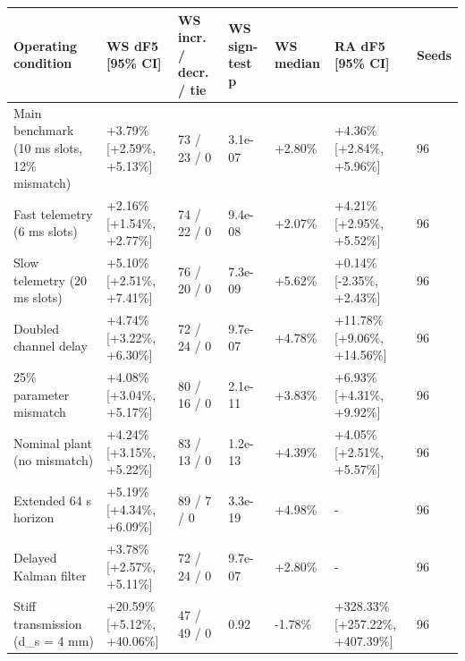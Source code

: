 \begin{tabular}{@{}lllllll@{}}
\toprule
Operating condition & WS dF5 [95\% CI] & WS incr. / decr. / tie & WS sign-test p & WS median & RA dF5 [95\% CI] & Seeds \\
\midrule
Main benchmark (10 ms slots, 12\% mismatch) & +3.79\% [+2.59\%, +5.13\%] & 73 / 23 / 0 & 3.1e-07 & +2.80\% & +4.36\% [+2.84\%, +5.96\%] & 96 \\
Fast telemetry (6 ms slots) & +2.16\% [+1.54\%, +2.77\%] & 74 / 22 / 0 & 9.4e-08 & +2.07\% & +4.21\% [+2.95\%, +5.52\%] & 96 \\
Slow telemetry (20 ms slots) & +5.10\% [+2.51\%, +7.41\%] & 76 / 20 / 0 & 7.3e-09 & +5.62\% & +0.14\% [-2.35\%, +2.43\%] & 96 \\
Doubled channel delay & +4.74\% [+3.22\%, +6.30\%] & 72 / 24 / 0 & 9.7e-07 & +4.78\% & +11.78\% [+9.06\%, +14.56\%] & 96 \\
25\% parameter mismatch & +4.08\% [+3.04\%, +5.17\%] & 80 / 16 / 0 & 2.1e-11 & +3.83\% & +6.93\% [+4.31\%, +9.92\%] & 96 \\
Nominal plant (no mismatch) & +4.24\% [+3.15\%, +5.22\%] & 83 / 13 / 0 & 1.2e-13 & +4.39\% & +4.05\% [+2.51\%, +5.57\%] & 96 \\
Extended 64 s horizon & +5.19\% [+4.34\%, +6.09\%] & 89 / 7 / 0 & 3.3e-19 & +4.98\% & - & 96 \\
Delayed Kalman filter & +3.78\% [+2.57\%, +5.11\%] & 72 / 24 / 0 & 9.7e-07 & +2.80\% & - & 96 \\
Stiff transmission (d\_s = 4 mm) & +20.59\% [+5.12\%, +40.06\%] & 47 / 49 / 0 & 0.92 & -1.78\% & +328.33\% [+257.22\%, +407.39\%] & 96 \\
\bottomrule
\end{tabular}

